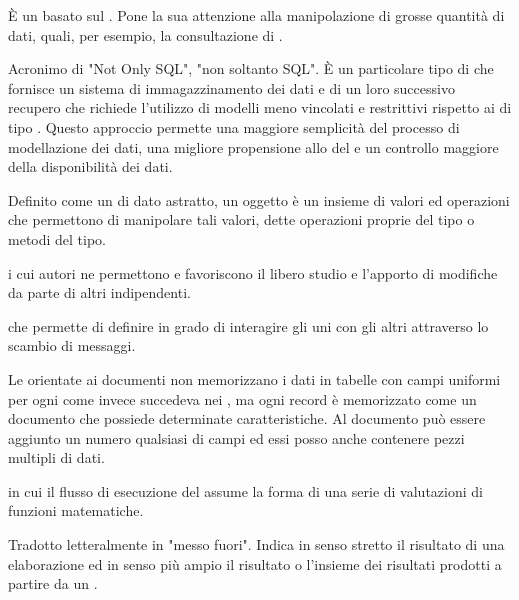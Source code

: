 
{\`{E} un  basato sul  . Pone la sua attenzione alla manipolazione di grosse quantità di dati, quali, per esempio, la consultazione di .}

{Acronimo di "Not Only SQL", "non soltanto SQL". \`{E} un particolare tipo di  che fornisce un sistema di immagazzinamento dei dati e di un loro successivo recupero che richiede l'utilizzo di modelli meno vincolati e restrittivi rispetto ai  di tipo . Questo approccio permette una maggiore semplicità del processo di modellazione dei dati, una migliore propensione allo  del  e un controllo maggiore della disponibilità dei dati.}


{Definito come un  di dato astratto, un oggetto è un insieme di valori ed operazioni che permettono di manipolare tali valori, dette operazioni proprie del tipo o metodi del tipo.}

{ i cui autori ne permettono e favoriscono il libero studio e l'apporto di modifiche da parte di altri  indipendenti.}

{ che permette di definire  in grado di interagire gli uni con gli altri attraverso lo scambio di messaggi.}

{Le  orientate ai documenti non memorizzano i dati in tabelle con campi uniformi per ogni  come invece succedeva nei , ma ogni record è memorizzato come un documento che possiede determinate caratteristiche. Al documento può essere aggiunto un numero qualsiasi di campi ed essi posso anche contenere pezzi multipli di dati.}

{ in cui il flusso di esecuzione del  assume la forma di una serie di valutazioni di funzioni matematiche.}

{Tradotto letteralmente in "messo fuori". Indica in senso stretto il risultato di una elaborazione ed in senso più ampio il risultato o l'insieme dei risultati prodotti a partire da un .}

